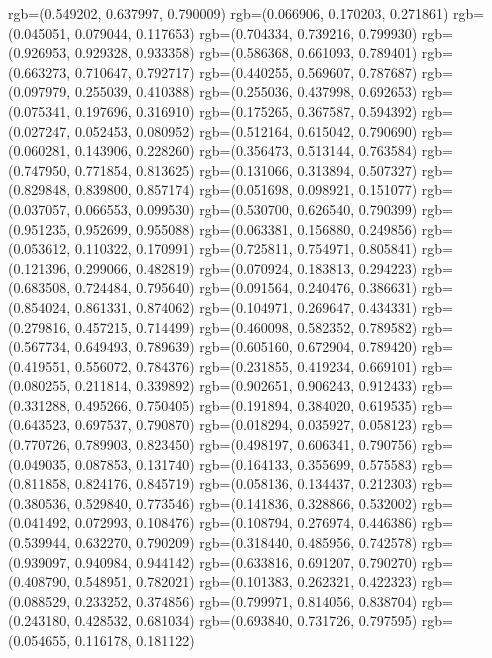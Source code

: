 {{{					rgb=(0.549202, 0.637997, 0.790009)
					rgb=(0.066906, 0.170203, 0.271861)
					rgb=(0.045051, 0.079044, 0.117653)
					rgb=(0.704334, 0.739216, 0.799930)
					rgb=(0.926953, 0.929328, 0.933358)
					rgb=(0.586368, 0.661093, 0.789401)
					rgb=(0.663273, 0.710647, 0.792717)
					rgb=(0.440255, 0.569607, 0.787687)
					rgb=(0.097979, 0.255039, 0.410388)
					rgb=(0.255036, 0.437998, 0.692653)
					rgb=(0.075341, 0.197696, 0.316910)
					rgb=(0.175265, 0.367587, 0.594392)
					rgb=(0.027247, 0.052453, 0.080952)
					rgb=(0.512164, 0.615042, 0.790690)
					rgb=(0.060281, 0.143906, 0.228260)
					rgb=(0.356473, 0.513144, 0.763584)
					rgb=(0.747950, 0.771854, 0.813625)
					rgb=(0.131066, 0.313894, 0.507327)
					rgb=(0.829848, 0.839800, 0.857174)
					rgb=(0.051698, 0.098921, 0.151077)
					rgb=(0.037057, 0.066553, 0.099530)
					rgb=(0.530700, 0.626540, 0.790399)
					rgb=(0.951235, 0.952699, 0.955088)
					rgb=(0.063381, 0.156880, 0.249856)
					rgb=(0.053612, 0.110322, 0.170991)
					rgb=(0.725811, 0.754971, 0.805841)
					rgb=(0.121396, 0.299066, 0.482819)
					rgb=(0.070924, 0.183813, 0.294223)
					rgb=(0.683508, 0.724484, 0.795640)
					rgb=(0.091564, 0.240476, 0.386631)
					rgb=(0.854024, 0.861331, 0.874062)
					rgb=(0.104971, 0.269647, 0.434331)
					rgb=(0.279816, 0.457215, 0.714499)
					rgb=(0.460098, 0.582352, 0.789582)
					rgb=(0.567734, 0.649493, 0.789639)
					rgb=(0.605160, 0.672904, 0.789420)
					rgb=(0.419551, 0.556072, 0.784376)
					rgb=(0.231855, 0.419234, 0.669101)
					rgb=(0.080255, 0.211814, 0.339892)
					rgb=(0.902651, 0.906243, 0.912433)
					rgb=(0.331288, 0.495266, 0.750405)
					rgb=(0.191894, 0.384020, 0.619535)
					rgb=(0.643523, 0.697537, 0.790870)
					rgb=(0.018294, 0.035927, 0.058123)
					rgb=(0.770726, 0.789903, 0.823450)
					rgb=(0.498197, 0.606341, 0.790756)
					rgb=(0.049035, 0.087853, 0.131740)
					rgb=(0.164133, 0.355699, 0.575583)
					rgb=(0.811858, 0.824176, 0.845719)
					rgb=(0.058136, 0.134437, 0.212303)
					rgb=(0.380536, 0.529840, 0.773546)
					rgb=(0.141836, 0.328866, 0.532002)
					rgb=(0.041492, 0.072993, 0.108476)
					rgb=(0.108794, 0.276974, 0.446386)
					rgb=(0.539944, 0.632270, 0.790209)
					rgb=(0.318440, 0.485956, 0.742578)
					rgb=(0.939097, 0.940984, 0.944142)
					rgb=(0.633816, 0.691207, 0.790270)
					rgb=(0.408790, 0.548951, 0.782021)
					rgb=(0.101383, 0.262321, 0.422323)
					rgb=(0.088529, 0.233252, 0.374856)
					rgb=(0.799971, 0.814056, 0.838704)
					rgb=(0.243180, 0.428532, 0.681034)
					rgb=(0.693840, 0.731726, 0.797595)
					rgb=(0.054655, 0.116178, 0.181122)
}}}
